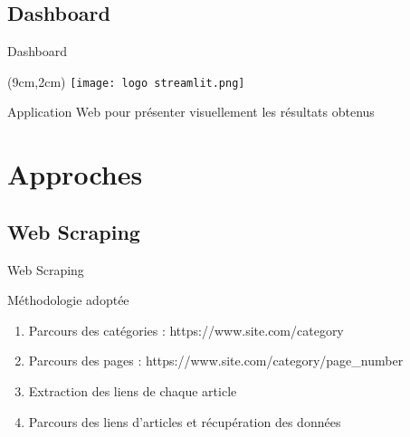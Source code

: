 \documentclass[10pt,sans,usenames,dvipsnames,english,compress]{beamer}
\begin{document}
\subsection{Dashboard}
\begin{frame}{Dashboard}
	\begin{textblock*}{3cm}(9cm,2cm)
		\texttt{[image: logo streamlit.png]}
	\end{textblock*}

	\vspace{1cm}

	\begin{block}{}
		Application Web pour présenter visuellement les résultats obtenus
	\end{block}

        \vspace{0.5cm}

\end{frame}

\section{Approches}
\subsection{Web Scraping}
\begin{frame}{Web Scraping}
	\begin{exampleblock}{Méthodologie adoptée}
		\begin{enumerate}
             \item Parcours des catégories : https://www.site.com/category
            \item Parcours des pages : https://www.site.com/category/page\_number
            \item Extraction des liens de chaque article
            \item Parcours des liens d'articles et récupération des données
            \end{enumerate}
	\end{exampleblock}
\end{frame}
\end{document}
